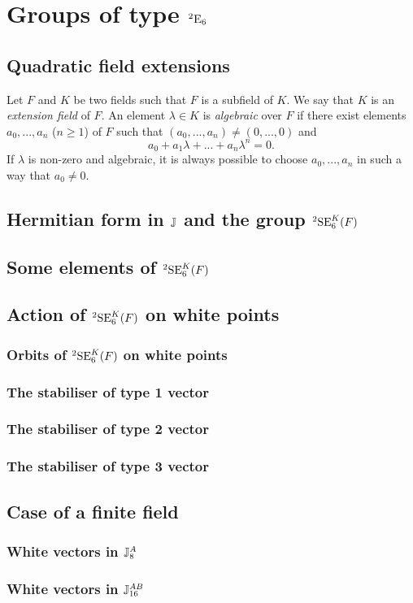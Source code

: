 \chapter{Groups of type ${}^2\mathord{\mathrm{E}}_6$}
\ifpdf
    \graphicspath{{Chapter3/Chapter3Figs/PNG/}{Chapter3/Chapter3Figs/PDF/}{Chapter3/Chapter3Figs/}}
\else
    \graphicspath{{Chapter3/Chapter3Figs/EPS/}{Chapter3/Chapter3Figs/}}
\fi

\section{Quadratic field extensions}

%
Let $F$ and $K$ be two fields such that $F$ is a subfield of $K$. We say that 
$K$ is an \textit{extension field} of $F$. An element $\lambda \in K$ is \textit{algebraic}
over $F$ if there exist elements $a_0, ..., a_n$ ($n \geqslant 1$) of $F$ such 
that $(a_0, ..., a_n) \neq (0, ..., 0)$ and 
\begin{equation}
a_0 + a_1 \lambda + ... + a_n \lambda^n = 0.
\end{equation}
If $\lambda$ is non-zero and algebraic, it is always possible to choose $a_0, ..., a_n$ in such
a way that $a_0 \neq 0$.



\section{Hermitian form in $\mathbb{J}$ and the group ${}^2\mathrm{SE}_6^K(F)$}

\section{Some elements of ${}^2\mathrm{SE}_6^K(F)$}

\section{Action of ${}^2\mathrm{SE}_6^K(F)$ on white points}

\subsection{Orbits of ${}^2\mathrm{SE}_6^K(F)$ on white points}
\subsection{The stabiliser of type 1 vector}
\subsection{The stabiliser of type 2 vector}
\subsection{The stabiliser of type 3 vector}

\section{Case of a finite field}
\subsection{White vectors in $\mathbb{J}_8^A$}
\subsection{White vectors in $\mathbb{J}_{16}^{AB}$}



